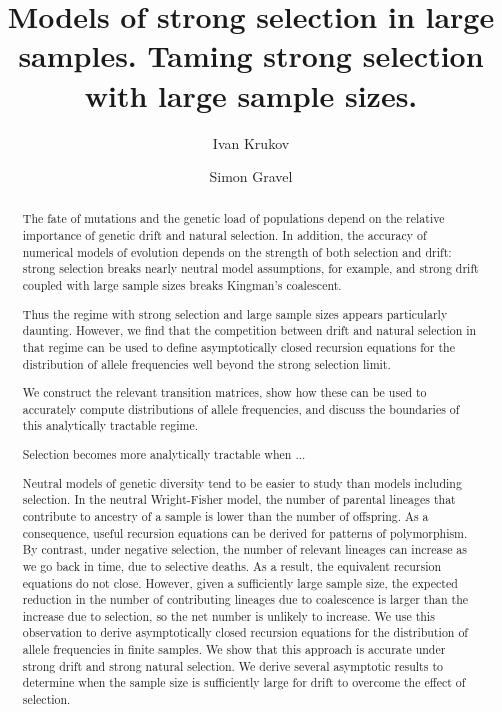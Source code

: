 \documentclass[review]{elsarticle}
\begin{document}
\begin{frontmatter}
  \title{Models of strong selection in large samples. 
  Taming strong selection with large sample sizes.  }

  \author{Ivan Krukov}
  \author{Simon Gravel}

  \begin{abstract}
  The fate of mutations and the genetic load of populations depend on the relative importance of 
  genetic drift and natural selection. In addition, the accuracy of numerical models of evolution
  depends on the strength of both selection and drift: strong selection breaks nearly neutral model assumptions, 
  for example, and strong drift coupled with large sample sizes breaks Kingman's coalescent. 
  
  Thus the regime with strong selection and large sample sizes appears particularly daunting. 
  However, we find that the competition between drift and natural selection in that regime can
  be used to define asymptotically closed recursion equations for the distribution 
  of allele frequencies well beyond the strong selection limit. 
 
  We construct the relevant transition matrices, show how these can
  be used to accurately compute distributions of allele frequencies, and
  discuss the boundaries of this analytically tractable regime. 
  
  Selection becomes more analytically tractable when ...
    
  
  
    Neutral models of genetic diversity tend to be easier to study than models including selection.
    In the neutral Wright-Fisher model, the number of parental lineages that contribute to ancestry
    of a sample is lower than the number of offspring. As a consequence, useful recursion equations
    can be derived for patterns of polymorphism. By contrast, under negative selection, the number
    of relevant lineages can increase as we go back in time, due to selective deaths. As a result,
    the equivalent recursion equations do not close. However, given a sufficiently large sample
    size, the expected reduction in the number of contributing lineages due to coalescence is larger
    than the increase due to selection, so the net number is unlikely to increase. We use this
    observation to derive asymptotically closed recursion equations for the distribution of allele
    frequencies in finite samples. We show that this approach is accurate under strong drift and
    strong natural selection. We derive several asymptotic results to determine when the sample size
    is sufficiently large for drift to overcome the effect of selection.
  \end{abstract}

\end{frontmatter}
\end{document}
